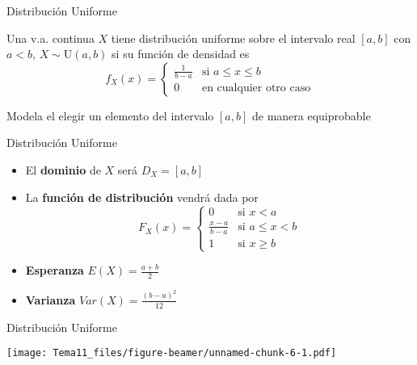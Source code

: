 \documentclass[
  ignorenonframetext,
]{beamer}
\begin{document}
\begin{frame}{Distribución Uniforme}
\protect\hypertarget{distribuciuxf3n-uniforme}{}

Una v.a. continua \(X\) tiene distribución uniforme sobre el intervalo
real \([a,b]\) con \(a<b\), \(X\sim\text{U}(a,b)\) si su función de
densidad es \[f_X(x)=\left\{
\begin{array}{rl}
     \frac{1}{b-a} & \text{si } a\le x\le b
  \\ 0 & \text{en cualquier otro caso}
\end{array}
\right.\]

Modela el elegir un elemento del intervalo \([a,b]\) de manera
equiprobable

\end{frame}

\begin{frame}{Distribución Uniforme}
\protect\hypertarget{distribuciuxf3n-uniforme-1}{}

\begin{itemize}
\item
  El \textbf{dominio} de \(X\) será \(D_X = [a,b]\)
\item
  La \textbf{función de distribución} vendrá dada por \[F_X(x)=\left\{
  \begin{array}{rl}
    0 & \text{si } x<a
  \\ \frac{x-a}{b-a} & \text{si } a\le x< b
  \\ 1 & \text{si } x\ge b
  \end{array}
  \right.\]
\item
  \textbf{Esperanza} \(E(X) = \frac{a+b}{2}\)
\item
  \textbf{Varianza} \(Var(X) = \frac{(b-a)^2}{12}\)
\end{itemize}

\end{frame}

\begin{frame}{Distribución Uniforme}
\protect\hypertarget{distribuciuxf3n-uniforme-2}{}

\texttt{[image: Tema11\_files/figure-beamer/unnamed-chunk-6-1.pdf]}

\end{frame}
\end{document}
